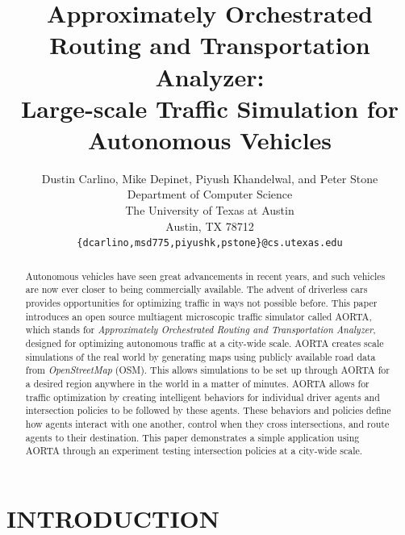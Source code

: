 \documentclass[letterpaper, 10 pt, conference]{ieeeconf}  %
\title{\LARGE \bf
Approximately Orchestrated Routing and Transportation Analyzer:\\
Large-scale Traffic Simulation for Autonomous Vehicles
}
\author{Dustin Carlino, Mike Depinet, Piyush Khandelwal, and Peter Stone\\
        Department of Computer Science\\
        The University of Texas at Austin\\
        Austin, TX 78712\\
        {\tt \small\{dcarlino,msd775,piyushk,pstone\}@cs.utexas.edu}}
\begin{document}
\maketitle
\thispagestyle{empty}
\pagestyle{empty}


\begin{abstract} 

Autonomous vehicles have seen great advancements in recent years, and such
vehicles are now ever closer to being commercially available. The advent of
driverless cars provides opportunities for optimizing traffic in ways not
possible before. This paper introduces an open source multiagent microscopic
traffic simulator called AORTA, which stands for \textit{Approximately
Orchestrated Routing and Transportation Analyzer}, designed for optimizing
autonomous traffic at a city-wide scale. AORTA creates scale simulations of the
real world by generating maps using publicly available road data from
\textit{OpenStreetMap} (OSM). This allows simulations to be set up through
AORTA for a desired region anywhere in the world in a matter of minutes. AORTA
allows for traffic optimization by creating intelligent behaviors for
individual driver agents and intersection policies to be followed by these
agents. These behaviors and policies define how agents interact with one
another, control when they cross intersections, and route agents to their
destination. This paper demonstrates a simple application using AORTA through
an experiment testing intersection policies at a city-wide scale.

\end{abstract}


\section{INTRODUCTION}
\label{sec:introduction}


\end{document}
